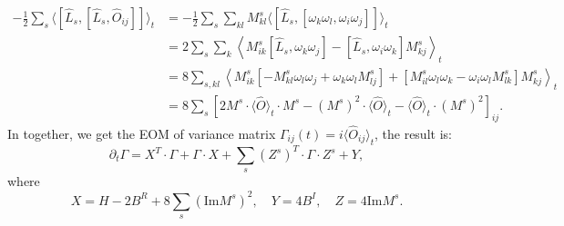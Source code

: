 \begin{equation*}
\begin{aligned}
	-\frac{1}{2}\sum_s \langle[\hat L_s,[\hat L_s, \hat O_{ij}]]\rangle_t
	&= -\frac{1}{2} \sum_s \sum_{kl} M^s_{kl}\langle[\hat L_s,[\omega_k \omega_l, \omega_i \omega_j]]\rangle_t \\
	&= 2\sum_s \sum_{k} \left\langle M^s_{ik}[\hat L_s,\omega_k \omega_j]-[\hat L_s,\omega_i \omega_k]M^s_{kj} \right\rangle_t \\
	&= 8\sum_{s,kl} \left\langle M^s_{ik}[-M^s_{kl}\omega_l\omega_j+\omega_k\omega_l M^s_{lj}]+[M^s_{il}\omega_l\omega_k-\omega_i\omega_l M^s_{lk}]M^s_{kj} \right\rangle_t \\
	&= 8\sum_s \left[2 M^s \cdot \langle\hat O\rangle_t\cdot M^s-(M^s)^2 \cdot \langle\hat O\rangle_t - \langle\hat O\rangle_t\cdot(M^s)^2 \right]_{ij}.
\end{aligned}
\end{equation*}
In together, we get the EOM of variance matrix $\Gamma_{ij}(t)=i\langle\hat O_{ij}\rangle_t$, the result is:
\begin{equation}
	\partial_t \Gamma = X^T\cdot\Gamma + \Gamma \cdot X + \sum_s (Z^s)^T \cdot \Gamma\cdot Z^s + Y,
\end{equation}
where
\begin{equation}
	X = H - 2B^R + 8 \sum_s (\mathrm{Im} M^s)^2, \quad
	Y = 4B^I, \quad 
	Z = 4 \mathrm{Im} M^s.
\end{equation}






